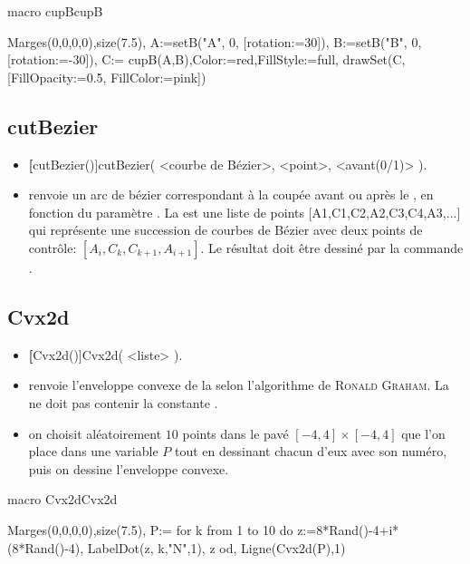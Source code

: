 \begin{demo}{macro cupB}{cupB}
\begin{texgraph}[name=cupB]
Marges(0,0,0,0),size(7.5),
A:=setB("A", 0, [rotation:=30]), 
B:=setB("B", 0, [rotation:=-30]),
C:= cupB(A,B),Color:=red,FillStyle:=full, 
drawSet(C, [FillOpacity:=0.5, FillColor:=pink])
\end{texgraph}
\end{demo}

\subsection{cutBezier}
\begin{itemize}
 \item \util \textbf[cutBezier()]{cutBezier( <courbe de Bézier>, <point>, <avant(0/1)> )}.
 \item \desc renvoie un arc de bézier correspondant à la  coupée avant ou après le , en fonction du paramètre . La  est une liste de points [A1,C1,C2,A2,C3,C4,A3,...] qui représente une succession de courbes de Bézier avec deux points de contrôle: $[A_i,C_k,C_{k+1},A_{i+1}]$. Le résultat doit être dessiné par la commande .
\end{itemize}


\subsection{Cvx2d}
\begin{itemize}
 \item \util \textbf[Cvx2d()]{Cvx2d( <liste> )}.
 \item \desc renvoie l'enveloppe convexe de la  selon l'algorithme de \textsc{Ronald Graham}. La  ne doit pas contenir la constante \jump.
 \item \exem on choisit aléatoirement $10$ points dans le pavé $[-4,4]\times[-4,4]$ que l'on place dans une variable $P$ tout en dessinant chacun d'eux avec son numéro, puis on dessine l'enveloppe convexe.
\end{itemize}

\begin{demo}{macro Cvx2d}{Cvx2d}
\begin{texgraph}[name=Cvx2d]
Marges(0,0,0,0),size(7.5),
P:= for k from 1 to 10 do
  z:=8*Rand()-4+i*(8*Rand()-4),
  LabelDot(z, k,"N",1), z
  od,
Ligne(Cvx2d(P),1)
\end{texgraph}
\end{demo}


